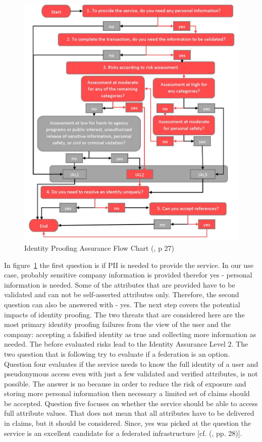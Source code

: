 \begin{figure}[h]
	\centering
	\includegraphics[width=1.0\linewidth]{images/ial_flow_red}
	\caption{Identity Proofing Assurance Flow Chart (\cite{NIST:2017:DIG}, p 27)}
	\label{fig:ialflow}
\end{figure}


In figure~\ref{fig:ialflow} the first question is if PII is needed to provide the service. In our use case, probably sensitive company information is provided therefor yes - personal information is needed. Some of the attributes that are provided have to be validated and can not be self-asserted attributes only. Therefore, the second question can also be answered with - yes.  The next step covers the potential impacts of identity proofing. The two threats that are considered here are the most primary identity proofing failures from the view of the user and the company: accepting a falsified identity as true and collecting more information as needed. The before evaluated risks lead to the Identity Assurance Level 2. The two question that is following try to evaluate if a federation is an option. Question four evaluates if the service needs to know the full identity of a user and pseudonymous access even with just a few validated and verified attributes, is not possible. The answer is no because in order to reduce the risk of exposure and storing more personal information then necessary a limited set of claims should be accepted. Question five focuses on whether the service should be able to access full attribute values. That does not mean that all attributes have to be delivered in claims, but it should be considered. Since, yes was picked at the question the service is an excellent candidate for a federated infrastructure [cf. (\cite{NIST:2017:DIG}, pp. 28)]. 

